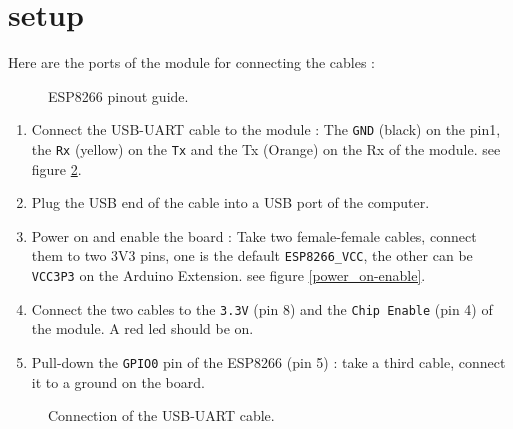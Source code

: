 \documentclass[11pt]{article}
\begin{document}
\section{setup}
Here are the ports of the module for connecting the cables :
\begin{figure}[H]
\caption{ESP8266 pinout guide.}
\label{ESP8266_pinout}
\end{figure}
\begin{enumerate}
\item Connect the USB-UART cable to the module : The \texttt{GND} (black) on the pin1, the \texttt{Rx} (yellow) on the \texttt{Tx} and the Tx (Orange) on the Rx of the module. see figure \ref{usb-uart_connection}.
\item Plug the USB end of the cable into a USB port of the computer.
\item Power on and enable the board : Take two female-female cables, connect them to two 3V3 pins, one is the default \texttt{ESP8266\_VCC}, the other can be \texttt{VCC3P3} on the Arduino Extension. see figure \ref{power_on-enable}.
\item Connect the two cables to the \texttt{3.3V} (pin 8) and the \texttt{Chip Enable} (pin 4) of the module. A red led should be on.
\item Pull-down the \texttt{GPIO0} pin of the ESP8266 (pin 5) : take a third cable, connect it to a ground on the board.
\end{enumerate}
\begin{figure}[H]
\caption{Connection of the USB-UART cable.}
\label{usb-uart_connection}
\end{figure}
\end{document}
